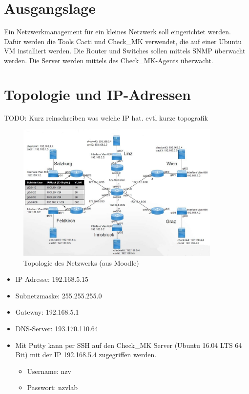 \thispagestyle{standard}
\pagestyle{standard}
\chapter{Ausgangslage}
\label{ausgangs}

Ein Netzwerkmanagement für ein kleines Netzwerk soll eingerichtet werden. Dafür werden die Tools Cacti und Check\_MK verwendet, die auf einer Ubuntu VM installiert werden. Die Router und Switches sollen mittels \ac{SNMP} überwacht werden. Die Server werden mittels des Check\_MK-Agents überwacht.

\chapter{Topologie und IP-Adressen}
\label{topo}

TODO: Kurz reinschreiben was welche IP hat. evtl kurze topografik

\begin{figure}[H]
	\centering
	\includegraphics[width=0.9\textwidth]{img/Topologie.JPG}
	\caption{Topologie des Netzwerks (aus Moodle)}
	\label{img:topologie}
\end{figure}

\begin{itemize}
\item IP Adresse: 192.168.5.15 
\item Subnetzmaske: 255.255.255.0
\item Gateway: 192.168.5.1
\item DNS-Server: 193.170.110.64
\item Mit Putty kann per SSH auf den Check\_MK Server (Ubuntu 16.04 LTS 64 Bit) mit der IP 192.168.5.4 zugegriffen werden.
\begin{itemize}
\item Username: nzv
\item Passwort: nzvlab
\end{itemize}
\end{itemize}

